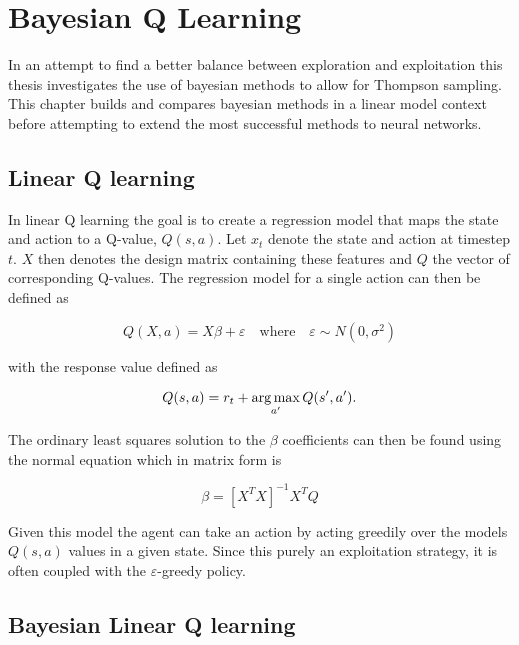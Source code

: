 \chapter{Bayesian Q Learning}{\label{ch:bdqn}}

In an attempt to find a better balance between exploration and exploitation this thesis investigates the use of bayesian methods to allow for Thompson sampling. This chapter builds and compares bayesian methods in a linear model context before attempting to extend the most successful methods to neural networks.

\section{Linear Q learning}

In linear Q learning the goal is to create a regression model that maps the state and action to a Q-value, $Q(s,a)$. Let $x_t$ denote the state and action at timestep $t$. $X$ then denotes the design matrix containing these features and $Q$ the vector of corresponding Q-values. The regression model for a single action can then be defined as

\begin{equation*}
	Q(X,a) = X\beta + \varepsilon \quad \text{where} \quad \varepsilon \sim N(0,\sigma^2)
\end{equation*}

with the response value defined as 

\begin{equation}
    \label{eq:q_target}
	Q(s,a) = r_t + \operatorname*{arg\,max}_{a'}Q(s',a').
\end{equation}

The ordinary least squares solution to the $\beta$ coefficients can then be found using the normal equation which in matrix form is

\begin{equation*}
	\beta = [X^TX]^{-1}X^TQ
\end{equation*}

Given this model the agent can take an action by acting greedily over the models $Q(s,a)$ values in a given state. Since this purely an exploitation strategy, it is often coupled with the $\varepsilon$-greedy policy.

\section{Bayesian Linear Q learning}

